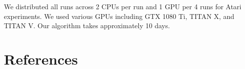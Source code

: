 \documentclass{article}
\begin{document}
\begin{appendices}
\begin{itemize}
We distributed all runs across 2 CPUs per run and 1 GPU per 4 runs for Atari experiments. We used various GPUs including GTX 1080 Ti, TITAN X, and TITAN V.
Our algorithm takes approximately 10 days.
\end{itemize}

\vfill
\pagebreak
\section{References}
\label{sec:Areferences}
\renewcommand{\section}[2]{}






\end{appendices}
\end{document}
